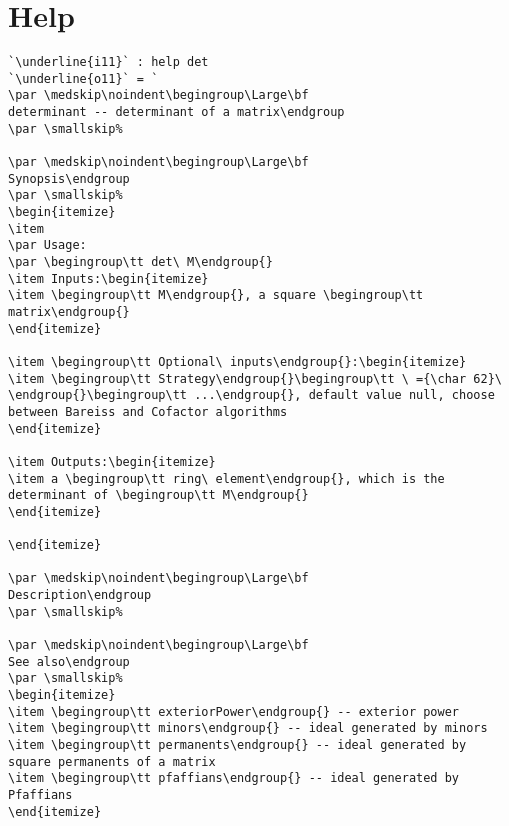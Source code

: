 \documentclass[12pt,a4paper]{amsart}
\begin{document}
\section{Help}
\begin{lstlisting}[language=Macaulay2]
`\underline{i11}` : help det
`\underline{o11}` = `
\par \medskip\noindent\begingroup\Large\bf
determinant -- determinant of a matrix\endgroup
\par \smallskip%

\par \medskip\noindent\begingroup\Large\bf
Synopsis\endgroup
\par \smallskip%
\begin{itemize}
\item 
\par Usage: 
\par \begingroup\tt det\ M\endgroup{}
\item Inputs:\begin{itemize}
\item \begingroup\tt M\endgroup{}, a square \begingroup\tt matrix\endgroup{}
\end{itemize}

\item \begingroup\tt Optional\ inputs\endgroup{}:\begin{itemize}
\item \begingroup\tt Strategy\endgroup{}\begingroup\tt \ ={\char 62}\ \endgroup{}\begingroup\tt ...\endgroup{}, default value null, choose between Bareiss and Cofactor algorithms
\end{itemize}

\item Outputs:\begin{itemize}
\item a \begingroup\tt ring\ element\endgroup{}, which is the determinant of \begingroup\tt M\endgroup{}
\end{itemize}

\end{itemize}

\par \medskip\noindent\begingroup\Large\bf
Description\endgroup
\par \smallskip%

\par \medskip\noindent\begingroup\Large\bf
See also\endgroup
\par \smallskip%
\begin{itemize}
\item \begingroup\tt exteriorPower\endgroup{} -- exterior power
\item \begingroup\tt minors\endgroup{} -- ideal generated by minors
\item \begingroup\tt permanents\endgroup{} -- ideal generated by square permanents of a matrix
\item \begingroup\tt pfaffians\endgroup{} -- ideal generated by Pfaffians
\end{itemize}


\end{lstlisting}
\end{document}
